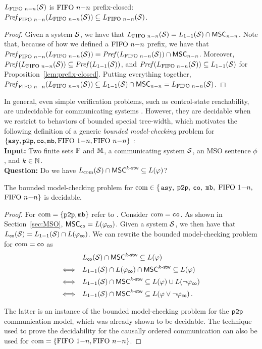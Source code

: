 \begin{proposition}\label{lem:nn-prefix-closed}
	$L_{\text{FIFO } n\mathsf{-}n}(\mathcal{S})$ is $\text{FIFO } n\mathsf{-}n$ prefix-closed:
	$\mathit{Pref}_{\text{FIFO } n\mathsf{-}n}(L_{\text{FIFO } n\mathsf{-}n}(\mathcal{S})) \subseteq L_{\text{FIFO } n\mathsf{-}n}(\mathcal{S})$.
\end{proposition}
\begin{proof}
	Given a system $\mathcal{S}$, we have that $L_{\text{FIFO } n\mathsf{-}n}(\mathcal{S}) = L_{1\mathsf{-}1}(\mathcal{S}) \cap \mathsf{MSC}_{n\mathsf{-}n}$. Note that, because of how we defined a $\text{FIFO } n\mathsf{-}n$ prefix, we have that $\mathit{Pref}_{\text{FIFO } n\mathsf{-}n}(L_{\text{FIFO } n\mathsf{-}n}(\mathcal{S})) = \mathit{Pref}(L_{\text{FIFO } n\mathsf{-}n}(\mathcal{S})) \cap \mathsf{MSC}_{n\mathsf{-}n}$. Moreover, $\mathit{Pref}(L_{\text{FIFO } n\mathsf{-}n}(\mathcal{S})) \subseteq \mathit{Pref}(L_{1\mathsf{-}1}(\mathcal{S}))$, and $\mathit{Pref}(L_{\text{FIFO } n\mathsf{-}n}(\mathcal{S})) \subseteq L_{1\mathsf{-}1}(\mathcal{S})$ for Proposition~\ref{lem:prefix-closed}. Putting everything together, $\mathit{Pref}_{\text{FIFO } n\mathsf{-}n}(L_{\text{FIFO } n\mathsf{-}n}(\mathcal{S})) \subseteq L_{1\mathsf{-}1}(\mathcal{S}) \cap \mathsf{MSC}_{n\mathsf{-}n} = L_{\text{FIFO } n\mathsf{-}n}(\mathcal{S})$.
\end{proof}

In general, even simple verification problems, such
as control-state reachability, are undecidable for
communicating systems \cite{DBLP:journals/jacm/BrandZ83}.
However, they are decidable when we restrict to behaviors of
bounded special tree-width, which motivates the following
definition of a generic \emph{bounded model-checking} problem for $\{\mathtt{asy}, \mathtt{p2p}, \mathtt{co}, \mathtt{mb}, \text{FIFO } 1\mathsf{-}n, \text{FIFO } n\mathsf{-}n \}$ :\\
%
{\bf Input:} Two finite sets $\mathbb{P}$ and $\mathbb{M}$, a communicating system $\mathcal{S}$, an MSO sentence $\phi$, and $k \in \mathbb{N}$.\\
%
{\bf Question:} Do we have $L_{\textup{com}}(\mathcal{S}) \cap \mathsf{MSC}^{k\textup{-}\mathsf{stw}} \subseteq L(\varphi)$?

\begin{theorem}
	\label{thm:bounded_model_checking}
	The bounded model-checking problem for $\textup{com} \in \{$$\mathtt{asy}, $ $\mathtt{p2p}, $ $\mathtt{co}, $ $\mathtt{mb}, $ $\text{FIFO } 1\mathsf{-}n, $ $\text{FIFO } n\mathsf{-}n\}$ is decidable.
\end{theorem}

\begin{proof}
    For $\textup{com} = \{\mathtt{p2p}, \mathtt{mb}\}$ refer to \cite{BolligFG21}. 
    Consider $\textup{com} = \mathtt{co}$. As shown in Section~\ref{sec:MSO}, $\mathsf{MSC}_{\mathtt{co}}=L(\varphi_{\mathsf{co}})$. Given a system $\mathcal{S}$, we then have that $L_{\mathsf{co}}(\mathcal{S}) = L_{1\mathsf{-}1}(\mathcal{S}) \cap L(\varphi_{\mathsf{co}})$. We can rewrite the bounded model-checking problem for $\textup{com} = \mathsf{co}$ as
    \[\begin{array}{rl}
    &L_{\mathsf{co}}(\mathcal{S}) \cap \mathsf{MSC}^{k\textup{-}\mathsf{stw}} \subseteq L(\varphi)\\[1ex]
    \Longleftrightarrow &L_{1\mathsf{-}1}(\mathcal{S}) \cap L(\varphi_{\mathsf{co}}) \cap \mathsf{MSC}^{k\textup{-}\mathsf{stw}} \subseteq L(\varphi)\\[1ex]
    \Longleftrightarrow &L_{1\mathsf{-}1}(\mathcal{S}) \cap \mathsf{MSC}^{k\textup{-}\mathsf{stw}} \subseteq L(\varphi) \cup L(\neg \varphi_{\mathsf{co}})\\[1ex]
    \Longleftrightarrow &L_{1\mathsf{-}1}(\mathcal{S}) \cap \mathsf{MSC}^{k\textup{-}\mathsf{stw}} \subseteq L(\varphi \vee \neg \varphi_{\mathsf{co}})\,.
    \end{array}\]

    The latter is an instance of the bounded model-checking problem for the $\mathtt{p2p}$ communication model, which was already shown to be decidable. The technique used to prove the decidability for the causally ordered communication can also be used for $\textup{com} = \{\text{FIFO } 1\mathsf{-}n, \text{FIFO } n\mathsf{-}n\}$.
\end{proof}

